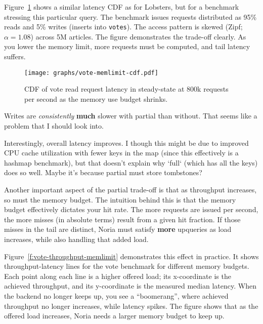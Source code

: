 Figure~\ref{f:vote-mem-latency} shows a similar latency CDF as for Lobsters, but
for a benchmark stressing this particular query. The benchmark issues requests
distributed as 95\% reads and 5\% writes (inserts into \texttt{votes}). The
access pattern is skewed (Zipf; $\alpha = 1.08$) across 5M articles. The figure
demonstrates the trade-off clearly. As you lower the memory limit, more requests
must be computed, and tail latency suffers.

\begin{figure}[ht]
  \centering
  \texttt{[image: graphs/vote-memlimit-cdf.pdf]}
  \caption{CDF of vote read request latency in steady-state at 800k requests per
  second as the memory use budget shrinks.}
  \label{f:vote-mem-latency}
\end{figure}

\begin{inprogress}
  Writes are \textit{consistently} \textbf{much} slower with partial than
  without. That seems like a problem that I should look into.
\end{inprogress}

\begin{inprogress}
  Interestingly, overall latency improves. I though this might be due to
  improved CPU cache utilization with fewer keys in the map (since this
  effectively is a hashmap benchmark), but that doesn't explain why `full`
  (which has all the keys) does so well. Maybe it's because partial must store
  tombstones?
\end{inprogress}

Another important aspect of the partial trade-off is that as throughput
increases, so must the memory budget. The intuition behind this is that the
memory budget effectively dictates your hit rate. The more requests are issued
per second, the more misses (in absolute terms) result from a given hit
fraction. If those misses in the tail are distinct, Noria must satisfy
\textbf{more} upqueries as load increases, while also handling that added load.

Figure~\ref{f:vote-throughput-memlimit} demonstrates this effect in practice. It
shows throughput-latency lines for the vote benchmark for different memory
budgets. Each point along each line is a higher offered load; its x-coordinate
is the achieved throughput, and its y-coordinate is the measured median latency.
When the backend no longer keeps up, you see a ``boomerang'', where
achieved throughput no longer increases, while latency spikes. The figure
shows that as the offered load increases, Noria needs a larger memory budget to
keep up.

